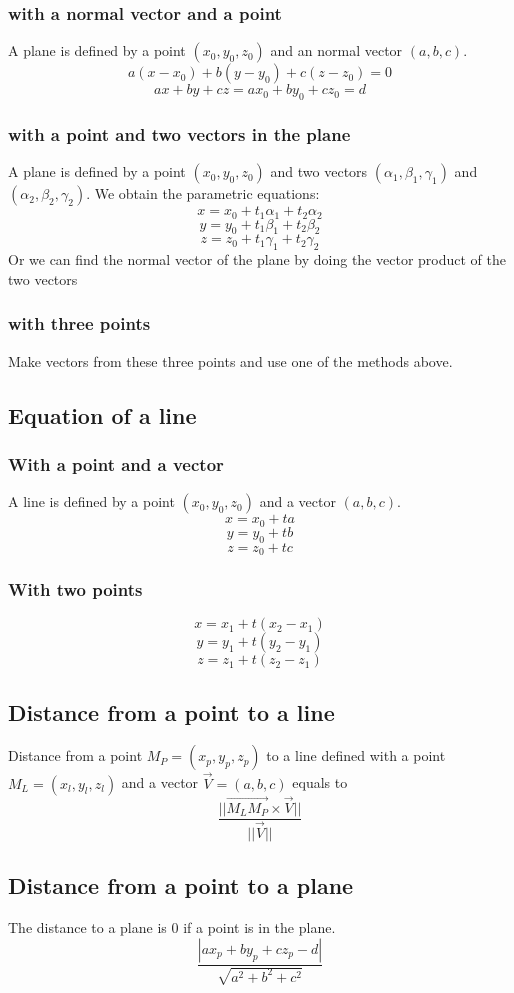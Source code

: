 \subsubsection{with a normal vector and a point}
A plane is defined by a point $(x_0, y_0, z_0)$ and an normal vector $(a, b, c)$.
$$a(x-x_0)+b(y-y_0)+c(z-z_0)=0$$
$$ax+by+cz=ax_0+by_0+cz_0=d$$
\subsubsection{with a point and two vectors in the plane}
A plane is defined by a point $(x_0, y_0, z_0)$ and two vectors $(\alpha_1, \beta_1, \gamma_1)$ and $(\alpha_2, \beta_2, \gamma_2)$. We obtain the parametric equations:
$$x=x_0+t_1\alpha_1+t_2\alpha_2$$
$$y=y_0+t_1\beta_1+t_2\beta_2$$
$$z=z_0+t_1\gamma_1+t_2\gamma_2$$
Or we can find the normal vector of the plane by doing the vector product of the two vectors
\subsubsection{with three points}
Make vectors from these three points and use one of the methods above.
\subsection{Equation of a line}
\subsubsection{With a point and a vector}
A line is defined by a point $(x_0, y_0, z_0)$ and a vector $(a, b, c)$.
$$x=x_0+ta$$
$$y=y_0+tb$$
$$z=z_0+tc$$
\subsubsection{With two points}
$$x=x_1+t(x_2-x_1)$$
$$y=y_1+t(y_2-y_1)$$
$$z=z_1+t(z_2-z_1)$$
\subsection{Distance from a point to a line}
Distance from a point $M_P=(x_p, y_p, z_p)$ to a line defined with a point $M_L=(x_l, y_l, z_l)$ and a vector $\vec{V}=(a, b, c)$ equals to
$$\frac{||\vec{M_LM_P}\times\vec{V}||}{||\vec{V}||}$$
\subsection{Distance from a point to a plane}
The distance to a plane is 0 if a point is in the plane.
$$\frac{|ax_p+by_p+cz_p-d|}{\sqrt{a^2+b^2+c^2}}$$
